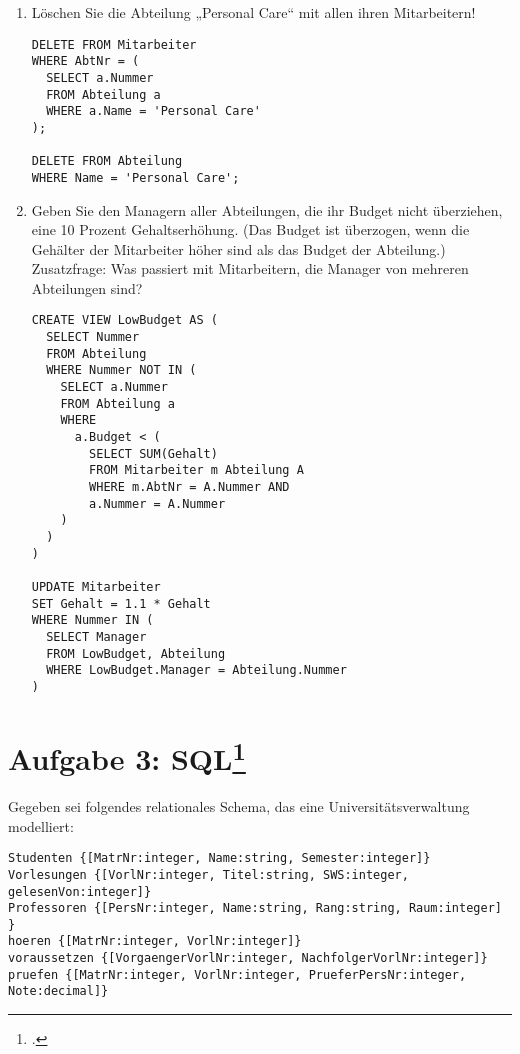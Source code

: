 \documentclass{lehramt-informatik-haupt}
\begin{document}
\begin{enumerate}

\item Löschen Sie die Abteilung „Personal Care“ mit allen ihren
Mitarbeitern!

\begin{antwort}[muster]
\begin{verbatim}
DELETE FROM Mitarbeiter
WHERE AbtNr = (
  SELECT a.Nummer
  FROM Abteilung a
  WHERE a.Name = 'Personal Care'
);

DELETE FROM Abteilung
WHERE Name = 'Personal Care';
\end{verbatim}
\end{antwort}


\item Geben Sie den Managern aller Abteilungen, die ihr Budget nicht
überziehen, eine 10 Prozent Gehaltserhöhung. (Das Budget ist überzogen,
wenn die Gehälter der Mitarbeiter höher sind als das Budget der
Abteilung.) Zusatzfrage: Was passiert mit Mitarbeitern, die Manager von
mehreren Abteilungen sind?

\begin{antwort}[muster]
\begin{verbatim}
CREATE VIEW LowBudget AS (
  SELECT Nummer
  FROM Abteilung
  WHERE Nummer NOT IN (
    SELECT a.Nummer
    FROM Abteilung a
    WHERE
      a.Budget < (
        SELECT SUM(Gehalt)
        FROM Mitarbeiter m Abteilung A
        WHERE m.AbtNr = A.Nummer AND
        a.Nummer = A.Nummer
    )
  )
)

UPDATE Mitarbeiter
SET Gehalt = 1.1 * Gehalt
WHERE Nummer IN (
  SELECT Manager
  FROM LowBudget, Abteilung
  WHERE LowBudget.Manager = Abteilung.Nummer
)
\end{verbatim}
\end{antwort}

\end{enumerate}

%

\section{Aufgabe 3: SQL\footcite{db:pu:2}}

Gegeben sei folgendes relationales Schema, das eine
Universitätsverwaltung modelliert:

\begin{verbatim}
Studenten {[MatrNr:integer, Name:string, Semester:integer]}
Vorlesungen {[VorlNr:integer, Titel:string, SWS:integer, gelesenVon:integer]}
Professoren {[PersNr:integer, Name:string, Rang:string, Raum:integer] }
hoeren {[MatrNr:integer, VorlNr:integer]}
voraussetzen {[VorgaengerVorlNr:integer, NachfolgerVorlNr:integer]}
pruefen {[MatrNr:integer, VorlNr:integer, PrueferPersNr:integer, Note:decimal]}
\end{verbatim}
\end{document}
